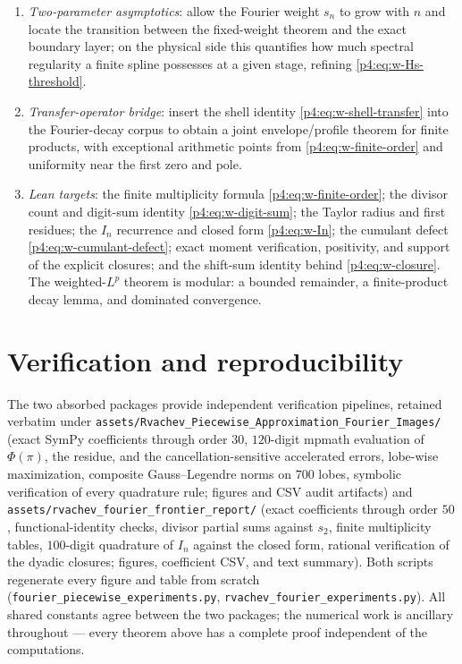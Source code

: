 \documentclass[11pt,oneside]{article}
\numberwithin{equation}{section}
\theoremstyle{definition}
\theoremstyle{remark}
\begin{document}
\begin{enumerate}
      equation to the cotangent product).
\item \emph{Two-parameter asymptotics}: allow the Fourier weight $s_n$ to
      grow with $n$ and locate the transition between the fixed-weight
      theorem and the exact boundary layer; on the physical side this
      quantifies how much spectral regularity a finite spline possesses at
      a given stage, refining \eqref{p4:eq:w-Hs-threshold}.
\item \emph{Transfer-operator bridge}: insert the shell identity
      \eqref{p4:eq:w-shell-transfer} into the Fourier-decay corpus to obtain
      a joint envelope/profile theorem for finite products, with
      exceptional arithmetic points from \eqref{p4:eq:w-finite-order} and
      uniformity near the first zero and pole.
\item \emph{Lean targets}: the finite multiplicity formula
      \eqref{p4:eq:w-finite-order}; the divisor count and digit-sum identity
      \eqref{p4:eq:w-digit-sum}; the Taylor radius and first residues; the
      $I_n$ recurrence and closed form \eqref{p4:eq:w-In}; the cumulant
      defect \eqref{p4:eq:w-cumulant-defect}; exact moment verification,
      positivity, and support of the explicit closures; and the shift-sum
      identity behind \eqref{p4:eq:w-closure}.  The weighted-$L^p$ theorem is
      modular: a bounded remainder, a finite-product decay lemma, and
      dominated convergence.
\end{enumerate}

\section{Verification and reproducibility}
\label{p4:sec:w-verification}

The two absorbed packages provide independent verification pipelines,
retained verbatim under
\nolinkurl{assets/Rvachev_Piecewise_Approximation_Fourier_Images/} (exact
SymPy coefficients through order $30$, $120$-digit mpmath evaluation of
$\Phi(\pi)$, the residue, and the cancellation-sensitive accelerated
errors, lobe-wise maximization, composite Gauss--Legendre norms on $700$
lobes, symbolic verification of every quadrature rule; figures and CSV
audit artifacts) and
\nolinkurl{assets/rvachev_fourier_frontier_report/} (exact coefficients
through order $50$, functional-identity checks, divisor partial sums
against $s_2$, finite multiplicity tables, $100$-digit quadrature of
$I_n$ against the closed form, rational verification of the dyadic
closures; figures, coefficient CSV, and text summary).  Both scripts
regenerate every figure and table from scratch
(\texttt{fourier\_piecewise\_experiments.py},
\texttt{rvachev\_fourier\_experiments.py}).  All shared constants agree
between the two packages; the numerical work is ancillary throughout ---
every theorem above has a complete proof independent of the computations.
\end{document}
